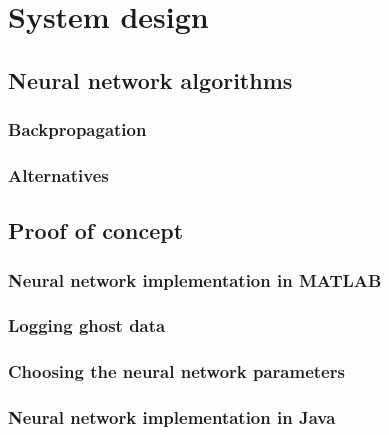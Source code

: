 \chapter{System design}
\label{ch:design}

\section{Neural network algorithms}

\subsection{Backpropagation}

\subsection{Alternatives}

\section{Proof of concept}

\subsection{Neural network implementation in MATLAB}

\subsection{Logging ghost data}

\subsection{Choosing the neural network parameters}

\subsection{Neural network implementation in Java}

